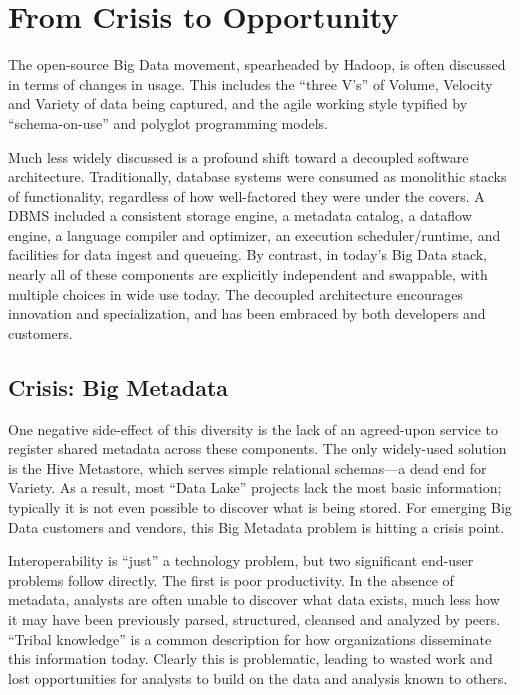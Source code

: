 \documentclass{sig-alternate}
\begin{document}
\section{From Crisis to Opportunity}
The open-source Big Data movement, spearheaded by Hadoop, is often discussed in terms of changes in usage. This includes the ``three V's'' of Volume, Velocity and Variety of data being captured, and the agile working style typified by ``schema-on-use'' and polyglot programming models.

Much less widely discussed is a profound shift toward a decoupled software architecture. Traditionally, database systems were consumed as monolithic stacks of functionality, regardless of how well-factored they were under the covers. %
A DBMS included a consistent storage engine, a metadata catalog, a dataflow engine, a language compiler and optimizer, an execution scheduler/runtime, and facilities for data ingest and queueing. %
By contrast, in today's Big Data stack, nearly all of these components are explicitly independent and swappable, with multiple choices in wide use today. The decoupled architecture encourages innovation and specialization, and has been embraced by both developers and customers.

\subsection{Crisis: Big Metadata}
One negative side-effect of this diversity is the lack of an agreed-upon service to register shared metadata 
across these components. The only widely-used solution is the Hive Metastore, which serves simple relational schemas---a dead end for Variety. As a result, most ``Data Lake'' projects lack the most basic information; typically it is not even possible to discover what is being stored. 
For emerging Big Data customers and vendors, this Big Metadata problem is hitting a crisis point.  

Interoperability is ``just'' a technology problem, but two significant end-user problems follow directly.
The first is poor productivity.
In the absence of metadata, analysts are often unable to discover what data exists, much less how it may have been previously parsed, structured, cleansed and analyzed by peers. ``Tribal knowledge'' is a common description for how organizations disseminate this information today. Clearly this is problematic, leading to wasted work and lost opportunities for analysts to build on the data and analysis known to others.
\end{document}
